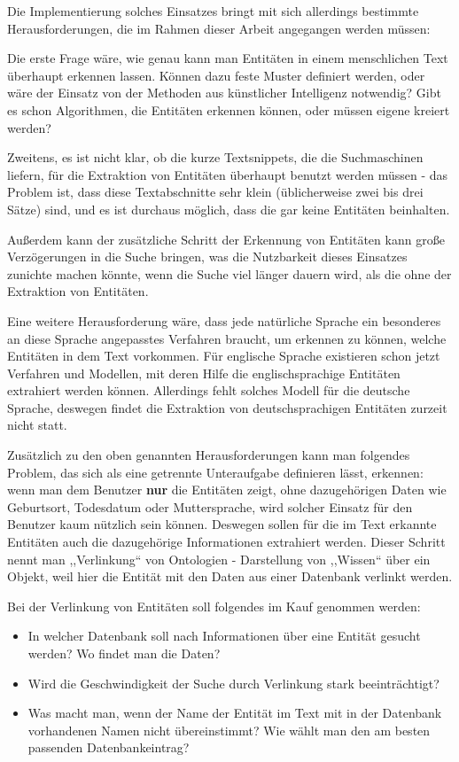 Die Implementierung solches Einsatzes bringt mit sich allerdings bestimmte Herausforderungen, die im Rahmen dieser Arbeit angegangen werden müssen:

Die erste Frage wäre, wie genau kann man Entitäten in einem menschlichen Text überhaupt erkennen lassen. Können dazu feste Muster definiert werden, oder wäre der Einsatz von der Methoden aus künstlicher Intelligenz notwendig? Gibt es schon Algorithmen, die Entitäten erkennen können, oder müssen eigene kreiert werden? 

Zweitens, es ist nicht klar, ob die kurze Textsnippets, die die Suchmaschinen liefern, für die Extraktion von Entitäten überhaupt benutzt werden müssen - das Problem ist, dass diese Textabschnitte sehr klein (üblicherweise zwei bis drei Sätze) sind, und es ist durchaus möglich, dass die gar keine Entitäten beinhalten.

Außerdem kann der zusätzliche Schritt der Erkennung von Entitäten kann große Verzögerungen in die Suche bringen, was die Nutzbarkeit dieses Einsatzes zunichte machen könnte, wenn die Suche viel länger dauern wird, als die ohne der Extraktion von Entitäten.

Eine weitere Herausforderung wäre, dass jede natürliche Sprache ein besonderes an diese Sprache angepasstes Verfahren braucht, um erkennen zu können, welche Entitäten in dem Text vorkommen. Für englische Sprache existieren schon jetzt Verfahren und Modellen, mit deren Hilfe die englischsprachige Entitäten extrahiert werden können. Allerdings fehlt solches Modell für die deutsche Sprache, deswegen findet die Extraktion von deutschsprachigen Entitäten zurzeit nicht statt.

Zusätzlich zu den oben genannten Herausforderungen kann man folgendes Problem, das sich als eine getrennte Unteraufgabe definieren lässt, erkennen: wenn man dem Benutzer \textbf{nur} die Entitäten zeigt, ohne dazugehörigen Daten wie Geburtsort, Todesdatum oder Muttersprache, wird solcher Einsatz für den Benutzer kaum nützlich sein können. Deswegen sollen für die im Text erkannte Entitäten auch die dazugehörige Informationen extrahiert werden. Dieser Schritt nennt man ,,Verlinkung`` von Ontologien - Darstellung von ,,Wissen`` über ein Objekt, weil hier die Entität mit den Daten aus einer Datenbank verlinkt werden.

Bei der Verlinkung von Entitäten soll folgendes im Kauf genommen werden:
\begin{itemize}
\item In welcher Datenbank soll nach Informationen über eine Entität gesucht werden? Wo findet man die Daten?
\item Wird die Geschwindigkeit der Suche durch Verlinkung stark beeinträchtigt?
\item Was macht man, wenn der Name der Entität im Text mit in der Datenbank vorhandenen Namen nicht übereinstimmt? Wie wählt man den am besten passenden Datenbankeintrag?
\end{itemize}

